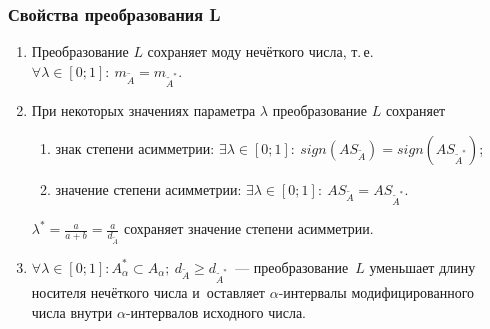 \documentclass[12pt]{beamer}
\begin{document}
\begin{frame}
  \frametitle{Свойства преобразования L}
  \begin{enumerate}
    \item Преобразование $L$ сохраняет моду нечёткого числа, т.\,е. $\forall \lambda \in \left[ 0;1 \right]:\ m_{\tilde A}=m_{\tilde A^{*}}$.
    \item При некоторых значениях параметра $\lambda$ преобразование $L$ сохраняет
      \begin{enumerate}
        \item знак степени асимметрии: $\exists \lambda \in [0;1]:\ sign(AS_{\tilde A})=sign(AS_{\tilde A^{*}})$;
        \item значение степени асимметрии: $\exists \lambda \in [0;1]:\ AS_{\tilde A}=AS_{\tilde A^{*}}$.
      \end{enumerate}
      $\displaystyle \lambda^* =\frac{a}{a+b}=\frac{a}{d_{\tilde A}}$ сохраняет значение степени асимметрии.
    \item $\forall \lambda \in \left[ 0;1 \right]: A_{\alpha}^{*}\subset A_\alpha;\ d_{\tilde A} \geqslant d_{\tilde A^{*}}$~--- преобразование~$L$ уменьшает длину носителя нечёткого числа и~оставляет $\alpha$-интервалы модифицированного числа внутри $\alpha$-интервалов исходного числа.
  \end{enumerate}
\end{frame}
\end{document}
